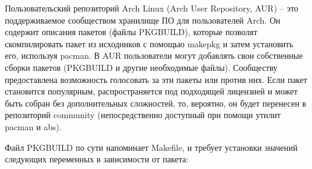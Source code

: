 Пользовательский репозиторий Arch Linux (Arch User Repository, AUR) -- это поддерживаемое сообществом хранилище ПО для пользователей Arch. Он содержит описания пакетов (файлы PKGBUILD), которые позволят скомпилировать пакет из исходников с помощью makepkg и затем установить его, используя pacman. В AUR пользователи могут добавлять свои собственные сборки пакетов (PKGBUILD и другие необходимые файлы). Сообществу предоставлена возможность голосовать за эти пакеты или против них. Если пакет становится популярным, распространяется под подходящей лицензией и может быть собран без дополнительных сложностей, то, вероятно, он будет перенесен в репозиторий community (непосредственно доступный при помощи утилит pacman и abs)\cite{Cit4}.

Файл PKGBUILD по сути напоминает Makefile, и требует установки значений следующих переменных в зависимости от пакета:

